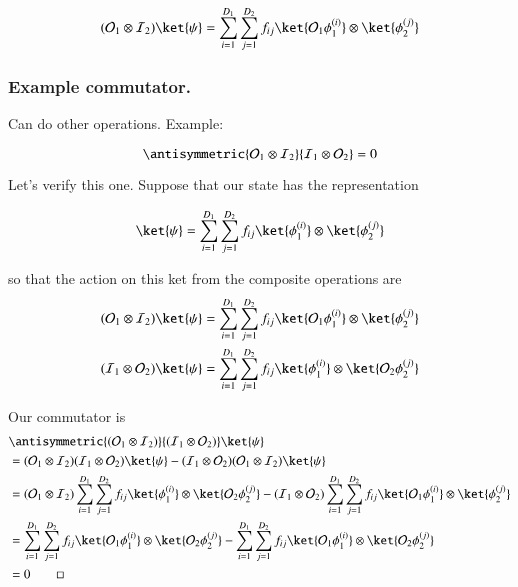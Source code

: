 \begin{equation}\label{eqn:qmTwoL1:290}
(\mathcal{O}_1 \otimes \mathcal{I}_2) \ket{\psi}
=
\sum_{i = 1}^{D_1}
\sum_{j = 1}^{D_2}
f_{ij}
\ket{ \mathcal{O}_1 \phi_1^{(i)}} \otimes \ket{ \phi_2^{(j)}} 
\end{equation}

\subsubsection{Example commutator.}

Can do other operations.  Example:

\begin{equation}\label{eqn:qmTwoL1:310}
\antisymmetric{ \mathcal{O}_1 \otimes \mathcal{I}_2 }{ \mathcal{I}_1 \otimes \mathcal{O}_2 } = 0
\end{equation}

Let's verify this one.  Suppose that our state has the representation

\begin{equation}\label{eqn:qmTwoL1:330}
\ket{\psi} 
= 
\sum_{i = 1}^{D_1}
\sum_{j = 1}^{D_2}
f_{ij}
\ket{ \phi_1^{(i)}} \otimes \ket{ \phi_2^{(j)}}
\end{equation}

so that the action on this ket from the composite operations are
\begin{align}\label{eqn:qmTwoL1:350}
(\mathcal{O}_1 \otimes \mathcal{I}_2)
\ket{\psi} 
&= 
\sum_{i = 1}^{D_1}
\sum_{j = 1}^{D_2}
f_{ij}
\ket{ \mathcal{O}_1 \phi_1^{(i)}} \otimes \ket{ \phi_2^{(j)}} \\
(\mathcal{I}_1 \otimes \mathcal{O}_2)
\ket{\psi} 
&= 
\sum_{i = 1}^{D_1}
\sum_{j = 1}^{D_2}
f_{ij}
\ket{ \phi_1^{(i)}} \otimes \ket{ \mathcal{O}_2 \phi_2^{(j)}}
\end{align}

Our commutator is
\begin{align*}
&\antisymmetric{(\mathcal{O}_1 \otimes \mathcal{I}_2)}{(\mathcal{I}_1 \otimes \mathcal{O}_2)}
\ket{\psi} \\
&=
(\mathcal{O}_1 \otimes \mathcal{I}_2)(\mathcal{I}_1 \otimes \mathcal{O}_2) 
\ket{\psi} 
-(\mathcal{I}_1 \otimes \mathcal{O}_2)(\mathcal{O}_1 \otimes \mathcal{I}_2)
\ket{\psi}  \\
&=
(\mathcal{O}_1 \otimes \mathcal{I}_2)
\sum_{i = 1}^{D_1}
\sum_{j = 1}^{D_2}
f_{ij}
\ket{ \phi_1^{(i)}} \otimes \ket{ \mathcal{O}_2 \phi_2^{(j)}}
-(\mathcal{I}_1 \otimes \mathcal{O}_2)
\sum_{i = 1}^{D_1}
\sum_{j = 1}^{D_2}
f_{ij}
\ket{ \mathcal{O}_1 \phi_1^{(i)}} \otimes \ket{ \phi_2^{(j)}} \\
&=
\sum_{i = 1}^{D_1}
\sum_{j = 1}^{D_2}
f_{ij}
\ket{ \mathcal{O}_1 \phi_1^{(i)}} \otimes \ket{ \mathcal{O}_2 \phi_2^{(j)}}
-
\sum_{i = 1}^{D_1}
\sum_{j = 1}^{D_2}
f_{ij}
\ket{ \mathcal{O}_1 \phi_1^{(i)}} \otimes \ket{ \mathcal{O}_2 \phi_2^{(j)}} \\
&=
0 \qquad \square
\end{align*}

